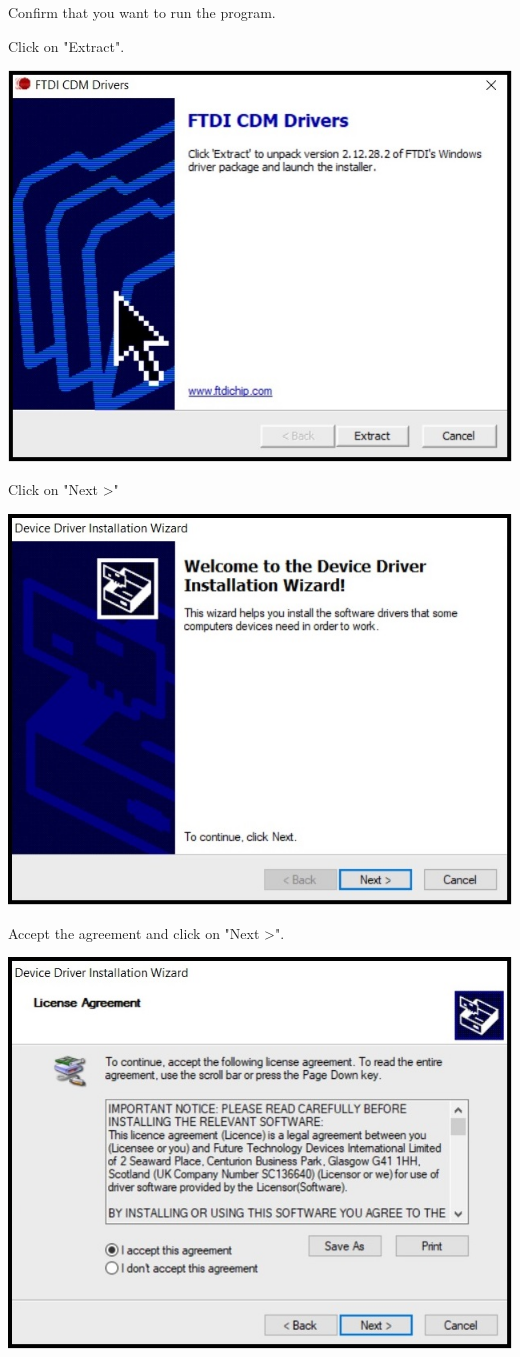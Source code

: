 Confirm that you want to run the program.

\begin{minipage}{\linewidth}
  Click on "Extract".
  \\
  \begin{center}
    \includegraphics[width=0.6\linewidth]{images/img001_install_drivers_02.jpg}
  \end{center}
\end{minipage}

\begin{minipage}{\linewidth}
  Click on "Next >"
  \\
  \begin{center}
    \includegraphics[width=0.6\linewidth]{images/img001_install_drivers_03.jpg}
  \end{center}
\end{minipage}

\begin{minipage}{\linewidth}
  Accept the agreement and click on "Next >".
  \\
  \begin{center}
    \includegraphics[width=0.6\linewidth]{images/img001_install_drivers_04.jpg}
  \end{center}
\end{minipage}

